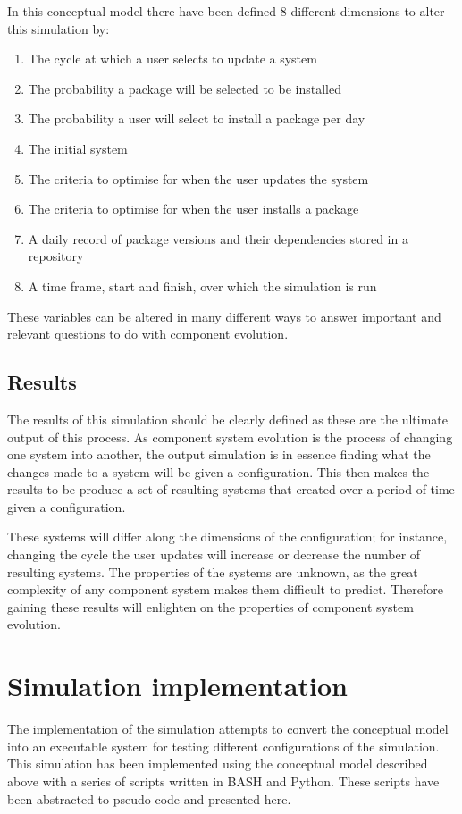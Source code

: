 In this conceptual model there have been defined 8 different dimensions to alter this simulation by:
\begin{enumerate}
  \item The cycle at which a user selects to update a system
  \item The probability a package will be selected to be installed
  \item The probability a user will select to install a package per day
  \item The initial system
  \item The criteria to optimise for when the user updates the system
  \item The criteria to optimise for when the user installs a package
  \item A daily record of package versions and their dependencies stored in a repository
  \item A time frame, start and finish, over which the simulation is run
\end{enumerate}

These variables can be altered in many different ways to answer important and relevant questions to do with component evolution.

\subsection{Results}
The results of this simulation should be clearly defined as these are the ultimate output of this process.
As component system evolution is the process of changing one system into another, 
the output simulation is in essence finding what the changes made to a system will be given a configuration.
This then makes the results to be produce a set of resulting systems that created over a period of time given a configuration. 

These systems will differ along the dimensions of the configuration;
for instance, changing the cycle the user updates will increase or decrease the number of resulting systems.
The properties of the systems are unknown, as the great complexity of any component system makes them difficult to predict.
Therefore gaining these results will enlighten on the properties of component system evolution.

\section{Simulation implementation}
The implementation of the simulation attempts to convert the conceptual model into an executable system for testing different configurations of the simulation.
This simulation has been implemented using the conceptual model described above with a series of scripts written in BASH and Python.
These scripts have been abstracted to pseudo code and presented here.

